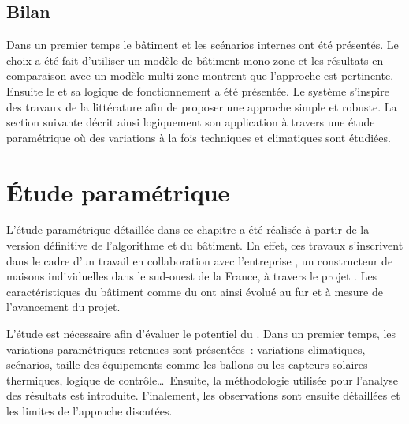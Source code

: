 \subsection{Bilan} %
\label{sub:bilan_cas_etude}
Dans un premier temps le bâtiment et les scénarios internes ont été présentés. Le
choix a été fait d’utiliser un modèle de bâtiment mono-zone et les résultats en
comparaison avec un modèle multi-zone montrent que l’approche est pertinente. Ensuite
le  et sa logique de fonctionnement a été présentée. Le système s’inspire
des travaux de la littérature afin de proposer une approche simple et robuste.
La section suivante décrit ainsi logiquement son application à travers une étude
paramétrique où des variations à la fois techniques et climatiques sont étudiées.







\section{Étude paramétrique} %
\label{sec:etude_parametrique}
L’étude paramétrique détaillée dans ce chapitre a été réalisée à partir de la version
définitive de l’algorithme et du bâtiment. En effet, ces travaux s’inscrivent dans le
cadre d’un travail en collaboration avec l’entreprise , un constructeur de
maisons individuelles dans le sud-ouest de la France, à travers le projet
. Les caractéristiques du bâtiment comme du  ont ainsi évolué
au fur et à mesure de l’avancement du projet.

L’étude est nécessaire afin d’évaluer le potentiel du . Dans un premier temps,
les variations paramétriques retenues sont présentées~: variations climatiques, scénarios,
taille des équipements comme les ballons ou les capteurs solaires thermiques, logique de
contrôle\dots\ Ensuite, la méthodologie utilisée pour l’analyse des résultats est
introduite. Finalement, les observations sont ensuite détaillées et les limites de
l’approche discutées.


